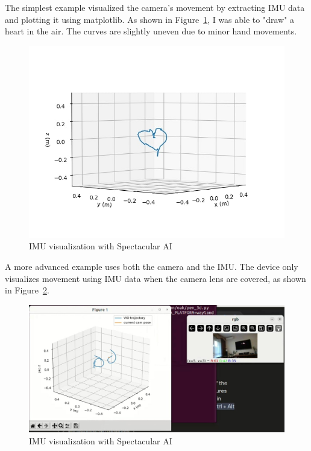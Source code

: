 The simplest example visualized the camera’s movement by extracting IMU data and plotting it using matplotlib. As shown in Figure~\ref{fig:IMU_visu}, I was able to "draw" a heart in the air. The curves are slightly uneven due to minor hand movements.

\begin{figure}[htbp]
	\centering
	\includegraphics[width=150mm, keepaspectratio]{figures_jpg/spectacular_ai_vio_visu.jpg}
	\caption{IMU visualization with Spectacular AI}
	\label{fig:IMU_visu}
\end{figure}

A more advanced example uses both the camera and the IMU. The device only visualizes movement using IMU data when the camera lens are covered, as shown in Figure~\ref{fig:3d_pen}.

\begin{figure}[htbp]
	\centering
	\includegraphics[width=150mm, keepaspectratio]{figures_jpg/3d_pen.jpg}
	\caption{IMU visualization with Spectacular AI}
	\label{fig:3d_pen}
\end{figure}

